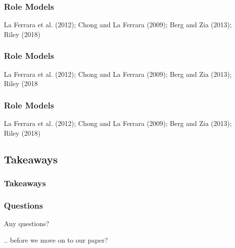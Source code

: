 \documentclass[hideothersubsections, usenames,dvipsnames,11pt]{beamer}
\newenvironment{itemize_2pt}{\itemize\addtolength{\itemsep}{2pt}}{\enditemize}
\begin{document}

\begin{frame}
\frametitle{Role Models}
	\begin{itemize_2pt}
	\item  La Ferrara et al. (2012); Chong and La Ferrara (2009); Berg and Zia (2013); Riley (2018)
	\vspace{0.1in}
	\end{itemize_2pt}
\end{frame}

\begin{frame}
\frametitle{Role Models}
	\begin{itemize_2pt}
	\item  La Ferrara et al. (2012); Chong and La Ferrara (2009); Berg and Zia (2013); Riley (2018
	\vspace{0.1in}
	\end{itemize_2pt}
\end{frame}

\begin{frame}
\frametitle{Role Models}
	\begin{itemize_2pt}
	\item  La Ferrara et al. (2012); Chong and La Ferrara (2009); Berg and Zia (2013); Riley (2018)
	\vspace{0.1in}
	\end{itemize_2pt}
\end{frame}



\subsection{Takeaways}

\begin{frame}
\frametitle{Takeaways}
	\begin{itemize_2pt}
    \item
   	\vspace{0.10in}
\end{itemize_2pt}
\end{frame}

\begin{frame}
\frametitle{Questions}
	\textcolor{bdf}{Any questions?}
	\begin{itemize_2pt}
	\item[] .. before we move on to our paper?
	\end{itemize_2pt}
\end{frame}
\end{document}
